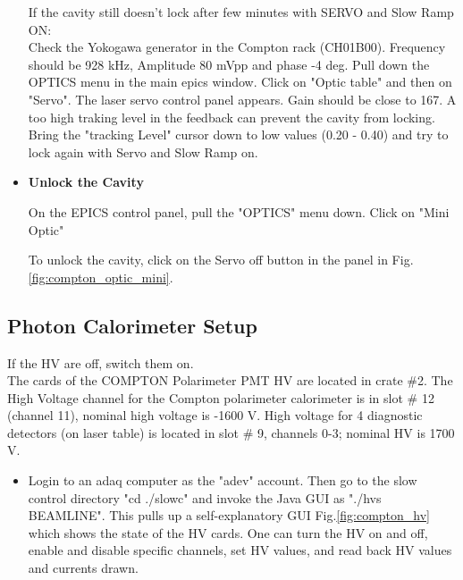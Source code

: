 \begin{itemize}
    If the cavity still doesn't lock after few minutes with SERVO and Slow Ramp ON:\\
Check the Yokogawa generator in the Compton rack (CH01B00).
Frequency should be 928 kHz, Amplitude 80 mVpp and phase -4 deg.
Pull down the OPTICS menu in the main epics window. Click on "Optic table" and then on "Servo".
The laser servo control panel appears.%
Gain should be close to 167. A too high traking level in the feedback can prevent the
cavity from locking. Bring the "tracking Level" cursor down to low values (0.20 - 0.40)
and try to lock again with Servo and Slow Ramp on.

\item {\bf Unlock the Cavity}

On the EPICS control panel, pull the "OPTICS" menu down. Click on "Mini Optic" 

To unlock the cavity, click on the Servo off button in the panel in Fig.\ref{fig:compton_optic_mini}.
\end{itemize}

\subsection{Photon Calorimeter Setup}

If the HV are off, switch them on.\\

The cards of the COMPTON Polarimeter PMT HV are located in crate \#2.
The High Voltage channel for the Compton polarimeter calorimeter is in slot \# 12 (channel 11), nominal
high voltage is -1600 V. High voltage for 4 diagnostic detectors (on laser table) is located in
slot \# 9, channels 0-3; nominal HV is 1700 V.


\begin{itemize}
\item Login to an adaq computer as the "adev" account.  Then go to
the slow control directory "cd ./slowc" and invoke the Java
GUI as "./hvs BEAMLINE".  This pulls up a self-explanatory
GUI Fig.\ref{fig:compton_hv} which shows the state of the HV cards.  One can turn
the HV on and off, enable and disable specific channels,
set HV values, and read back HV values and currents drawn.
\end{itemize}

